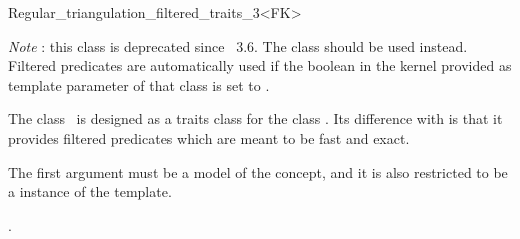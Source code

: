 

\begin{ccRefClass}{Regular_triangulation_filtered_traits_3<FK>}

\begin{ccDeprecated}

{\em Note} : this class is deprecated since \cgal\ 3.6.
The class  should be used instead.
Filtered predicates are automatically used if the boolean 
in the kernel provided as template parameter of that class is set to .

\ccDefinition
  
The class \ccRefName\ is designed as a traits class for the
class . 
Its difference with  is that it
provides filtered predicates which are meant to be fast and exact.

The first argument  must be a model of the  concept, and
it is also restricted to be a instance of the  template.


\ccIsModel
{}


\ccSeeAlso

.

\end{ccDeprecated}

\end{ccRefClass}
